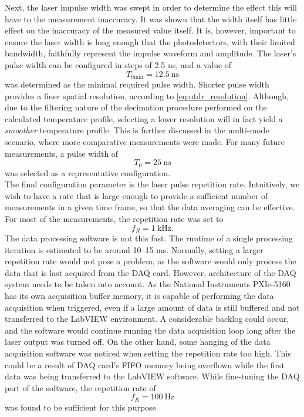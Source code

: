 \documentclass{standalone}
\begin{document}
Next, the laser impulse width was swept in order to determine the effect this will have to the measurement inaccuracy. It was shown that the width itself has little effect on the inaccuracy of the measured value itself. It is, however, important to ensure the laser width is long enough that the photodetectors, with their limited bandwidth, faithfully represent the impulse waveform and amplitude. The laser's pulse width can be configured in steps of 2.5 ns, and a value of
\begin{equation}
T_{0\textrm{min}} = \SI{12.5}{\nano \second}
\end{equation}
was determined as the minimal required pulse width. Shorter pulse width provides a finer spatial resolution, according to \ref{eq:otdr_resolution}. Although, due to the filtering nature of the decimation procedure performed on the calculated temperature profile, selecting a lower resolution will in fact yield a \textit{smoother} temperature profile. This is further discussed in the multi-mode scenario, where more comparative measurements were made. For many future measurements, a pulse width of
\begin{equation}
T_0 = \SI{25}{\nano \second}
\end{equation}
was selected as a representative configuration. \\

The final configuration parameter is the laser pulse repetition rate. Intuitively, we wish to have a rate that is large enough to provide a sufficient number of measurements in a given time frame, so that the data averaging can be effective. For most of the measurements, the repetition rate was set to
\begin{equation}
f_R = \SI{1}{\kilo \hertz} \textrm{.}
\end{equation}
The data processing software is not this fast. The runtime of a single processing iteration is estimated to be around 10--15 ms. Normally, setting a larger repetition rate would not pose a problem, as the software would only process the data that is last acquired from the DAQ card. However, architecture of the DAQ system needs to be taken into account. As the National Instruments PXIe-5160 has its own acquisition buffer memory, it is capable of performing the data acquisition when triggered, even if a large amount of data is still buffered and not transferred to the LabVIEW environment. A considerable backlog could occur, and the software would continue running the data acquisition loop long after the laser output was turned off. On the other hand, some hanging of the data acquisition software was noticed when setting the repetition rate too high. This could be a result of DAQ card's FIFO memory being overflown while the first data was being transferred to the LabVIEW software. While fine-tuning the DAQ part of the software, the repetition rate of
\begin{equation}
f_R = \SI{100}{\hertz}
\end{equation}
was found to be sufficient for this purpose. \\
\end{document}
